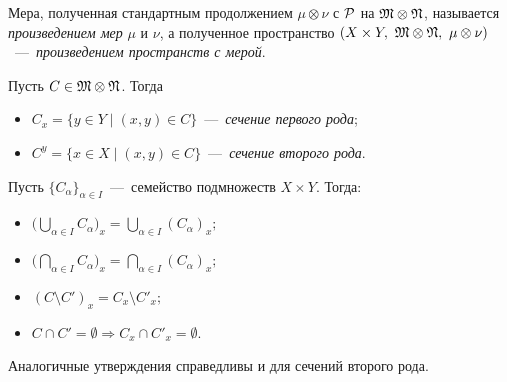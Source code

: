 \begin{definition}
    Мера, полученная стандартным продолжением $\mu \otimes \nu$ с $\mathcal{P}$ на $\mathfrak{M} \otimes \mathfrak{N}$, называется \textit{произведением мер} $\mu$ и $\nu$, а полученное пространство $(X \times Y, \ \mathfrak{M} \otimes \mathfrak{N}, \ \mu \otimes \nu)$~---~\textit{произведением пространств с мерой}.
\end{definition}
\begin{definition}
    Пусть $C \in \mathfrak{M} \otimes \mathfrak{N}$. Тогда \begin{itemize}
        \item $C_x = \{y \in Y \mid (x, y) \in C\}$~---~\textit{сечение первого рода};
        \item $C^y = \{x \in X \mid (x, y) \in C\}$~---~\textit{сечение второго рода}.
    \end{itemize}
\end{definition}
\begin{lemma}
    Пусть $\{C_\alpha\}_{\alpha \in I}$~---~семейство подмножеств $X \times Y$. Тогда:
    \begin{itemize}
        \item $\displaystyle \biggl(\bigcup\limits_{\alpha \in I} C_\alpha \biggr)_x = \bigcup\limits_{\alpha \in I} \left(C_\alpha\right)_x;$
        \item $\displaystyle \biggl(\bigcap\limits_{\alpha \in I} C_\alpha \biggr)_x = \bigcap\limits_{\alpha \in I} \left(C_\alpha\right)_x;$
        \item $\displaystyle (C \setminus C')_x = C_x \setminus C'_x;$
        \item $\displaystyle C \cap C' = \emptyset \Rightarrow C_x \cap C'_x = \emptyset.$
    \end{itemize}
    Аналогичные утверждения справедливы и для сечений второго рода.
\end{lemma}
